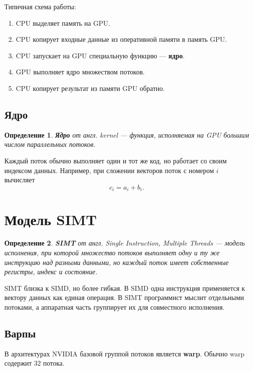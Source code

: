 \documentclass[12pt,a4paper]{article}
\newtheorem{definition}{Определение}
\begin{document}
Типичная схема работы:

\begin{enumerate}
    \item CPU выделяет память на GPU.
    \item CPU копирует входные данные из оперативной памяти в память GPU.
    \item CPU запускает на GPU специальную функцию --- \textbf{ядро}.
    \item GPU выполняет ядро множеством потоков.
    \item CPU копирует результат из памяти GPU обратно.
\end{enumerate}

\subsection{Ядро}

\begin{definition}
\textbf{Ядро} от англ. \emph{kernel} --- функция, исполняемая на GPU большим числом параллельных потоков.
\end{definition}

Каждый поток обычно выполняет один и тот же код, но работает со своим индексом данных. Например, при сложении векторов поток с номером $i$ вычисляет
\[
    c_i = a_i + b_i.
\]

\section{Модель SIMT}

\begin{definition}
\textbf{SIMT} от англ. \emph{Single Instruction, Multiple Threads} --- модель исполнения, при которой множество потоков выполняет одну и ту же инструкцию над разными данными, но каждый поток имеет собственные регистры, индекс и состояние.
\end{definition}

SIMT близка к SIMD, но более гибкая. В SIMD одна инструкция применяется к вектору данных как единая операция. В SIMT программист мыслит отдельными потоками, а аппаратная часть группирует их для совместного исполнения.

\subsection{Варпы}

В архитектурах NVIDIA базовой группой потоков является \textbf{warp}. Обычно warp содержит $32$ потока.
\end{document}
